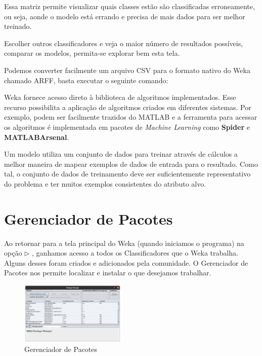 \documentclass[a4paper,11pt]{article}
\begin{document}
Essa matriz permite visualizar quais classes estão são classificadas erroneamente, ou seja, aonde o modelo está errando e precisa de mais dados para ser melhor treinado.

Escolher outros classificadores e veja o maior número de resultados possíveis, comparar os modelos, permita-se explorar bem esta tela.

\begin{theo}{}
	Podemos converter facilmente um arquivo CSV para o formato nativo do Weka chamado ARFF, basta executar o seguinte comando: \\
\end{theo}

Weka fornece acesso direto à biblioteca de algoritmos implementados. Esse recurso possibilita a aplicação de algoritmos criados em diferentes sistemas. Por exemplo, podem ser facilmente trazidos do MATLAB e a ferramenta para acessar os algoritmos é implementada em pacotes de \textit{Machine Learning} como \textbf{Spider} e \textbf{MATLABArsenal}.

Um modelo utiliza um conjunto de dados para treinar através de cálculos a melhor maneira de mapear exemplos de dados de entrada para o resultado. Como tal, o conjunto de dados de treinamento deve ser suficientemente representativo do problema e ter muitos exemplos consistentes do atributo alvo.

\section{Gerenciador de Pacotes}
Ao retornar para a tela principal do Weka (quando iniciamos o programa) na opção  $\triangleright$ , ganhamos acesso a todos os Classificadores que o Weka trabalha. Alguns desses foram criados e adicionados pela comunidade. O Gerenciador de Pacotes nos permite localizar e instalar o que desejamos trabalhar.

\begin{figure}[H]
	\centering
	\includegraphics[width=0.45\textwidth]{imagem/packageManager.png}
	\caption{Gerenciador de Pacotes}
\end{figure}
\end{document}
